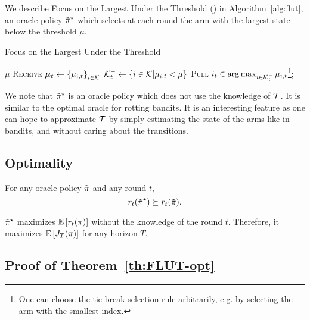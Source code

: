 We describe Focus on the Largest Under the Threshold (\FLUT) in Algorithm~\ref{alg:flut}, an oracle policy $\Tilde{\pi}^\star$ which selects at each round the arm with the largest state below the threshold $\mu$.
\begin{minipage}{\textwidth}
\renewcommand*\footnoterule{}
\begin{savenotes}
\begin{algorithm}[H]
\caption{Focus on the Largest Under the Threshold}%
\label{alg:flut}
\begin{algorithmic}[1]
\Require $\mu$
		\State \textsc{Receive} $\boldsymbol{\mu_t} \leftarrow \left\{\mu_{i,t}\right\}_{i \in \mathcal{K}}$
		\State $\mathcal{K}_t^- \leftarrow \left\{i \in \mathcal{K} | \mu_{i,t} < \mu \right\}$
		\If {$\armsbelow \neq \ev{}$}
		\textsc{Pull} $i_t \in \operatorname*{arg\,max}_{i \in \mathcal{K}_t^-} \mu_{i,t}$\footnote{One can choose the tie break selection rule arbitrarily, e.g. by selecting the arm with the smallest index.}; 
		\EndIf
	\EndFor
\end{algorithmic}
\end{algorithm}
\end{savenotes}
\end{minipage}
\begin{remark}
We note that $\Tilde{\pi}^\star$ is an oracle policy which does not use the knowledge of $\mathcal{T}$. It is similar to the optimal oracle for rotting bandits. It is an interesting feature as one can hope to approximate $\mathcal{T}$ by simply estimating the state of the arms like in bandits, and without caring about the transitions.
\end{remark}

\subsection{Optimality}
\begin{theorem}
\label{th:FLUT-opt}
For any oracle policy $\Tilde{\pi}$ and any round $t$, 
\[
r_t(\Tilde{\pi}^\star) \succeq r_t(\Tilde{\pi}).
\]
\end{theorem}

\begin{corollary}
$\Tilde{\pi}^\star$ maximizes $\mathbb{E}\left[r_t(\pi)\right]$ without the knowledge of the round $t$. Therefore, it maximizes $\mathbb{E}\left[J_T(\pi)\right]$ for any horizon $T$.
\end{corollary}


\subsection{Proof of Theorem~\ref{th:FLUT-opt}}
